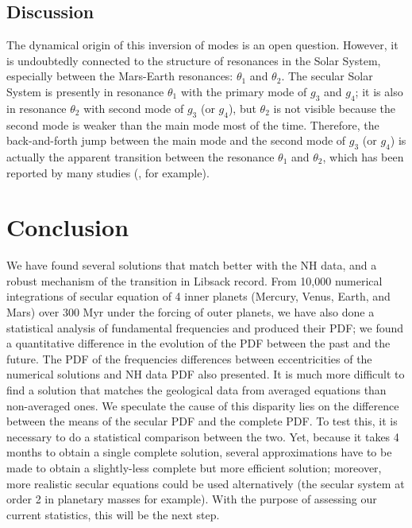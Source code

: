 \documentclass[12pt]{article}
\begin{document}
	\subsection{Discussion}
	The dynamical origin of this inversion of modes is an open question. However, it is undoubtedly connected to the structure of resonances in the Solar System, especially between the Mars-Earth resonances: $\theta_1$ and $\theta_2$. The secular Solar System is presently in resonance $\theta_1$ with the primary mode of $g_3$ and $g_4$; it is also in resonance $\theta_2$ with second mode of $g_3$ (or $g_4$), but $\theta_2$ is not visible because the second mode is weaker than the main mode most of the time. Therefore, the back-and-forth jump between the main mode and the second mode of $g_3$ (or $g_4$) is actually the apparent transition between the resonance $\theta_1$ and $\theta_2$, which has been reported by many studies (\cite{laskar1990}, \cite{laskar2004} for example).
	
	\section{Conclusion}
	We have found several solutions that match better with the NH data, and a robust mechanism of the transition in Libsack record. From 10,000 numerical integrations of secular equation of 4 inner planets (Mercury, Venus, Earth, and Mars) over 300 Myr under the forcing of outer planets, we have also done a statistical analysis of fundamental frequencies and produced their PDF; we found a quantitative difference in the evolution of the PDF between the past and the future. The PDF of the frequencies differences between eccentricities of the numerical solutions and NH data PDF also presented. It is much more difficult to find a solution that matches the geological data from averaged equations than non-averaged ones. We speculate the cause of this disparity lies on the difference between the means of the secular PDF and the complete PDF. To test this, it is necessary to do a statistical comparison between the two. Yet, because it takes 4 months to obtain a single complete solution, several approximations have to be made to obtain a slightly-less complete but more efficient solution; moreover, more realistic secular equations could be used alternatively (the secular system at order 2 in planetary masses \citep{laskar1985} for example). With the purpose of assessing our current statistics, this will be the next step.
	
	\newpage
	\appendix
	\appendixpage
\end{document}
